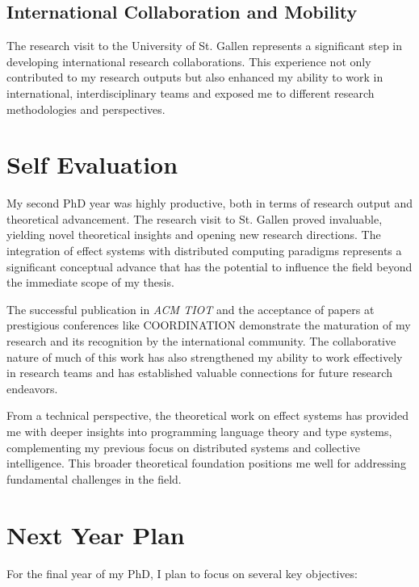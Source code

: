 \documentclass[runningheads]{llncs}
\begin{document}
\subsection{International Collaboration and Mobility}

The research visit to the University of St. Gallen represents a significant step in developing international research collaborations. This experience not only contributed to my research outputs but also enhanced my ability to work in international, interdisciplinary teams and exposed me to different research methodologies and perspectives.

\section{Self Evaluation}

My second PhD year was highly productive, both in terms of research output and theoretical advancement.
%
The research visit to St. Gallen proved invaluable,
yielding novel theoretical insights and opening new research directions.
%
The integration of effect systems with distributed computing paradigms represents a significant conceptual advance that has the potential to influence the field beyond the immediate scope of my thesis.

The successful publication in \emph{ACM TIOT} and the acceptance of papers at prestigious conferences like COORDINATION demonstrate the maturation of my research and its recognition by the international community.
%
The collaborative nature of much of this work has also strengthened my ability to work effectively in research teams and has established valuable connections for future research endeavors.

From a technical perspective,
the theoretical work on effect systems has provided me with deeper insights into programming language theory and type systems,
complementing my previous focus on distributed systems and collective intelligence.
%
This broader theoretical foundation positions me well for addressing fundamental challenges in the field.

\section{Next Year Plan}

For the final year of my PhD, I plan to focus on several key objectives:
\end{document}
